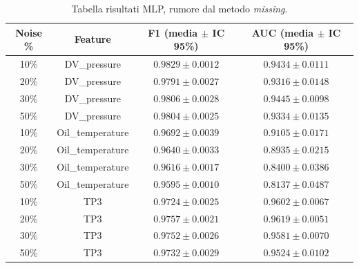 \documentclass[../main.tex]{subfiles}
\begin{document}
\begin{table}[H]
\centering\small
{}
\begin{tabular}{cccc}
\toprule
\textbf{Noise \%} & \textbf{Feature} & \textbf{F1 (media $\pm$ IC 95\%)} & \textbf{AUC (media $\pm$ IC 95\%)} \\
\midrule
10\% & DV\_pressure     & $0.9829 \pm 0.0012$ & $0.9434 \pm 0.0111$ \\
20\% & DV\_pressure     & $0.9791 \pm 0.0027$ & $0.9316 \pm 0.0148$ \\
30\% & DV\_pressure     & $0.9806 \pm 0.0028$ & $0.9445 \pm 0.0098$ \\
50\% & DV\_pressure     & $0.9804 \pm 0.0025$ & $0.9334 \pm 0.0135$ \\
\midrule
10\% & Oil\_temperature & $0.9692 \pm 0.0039$ & $0.9105 \pm 0.0171$ \\
20\% & Oil\_temperature & $0.9640 \pm 0.0033$ & $0.8935 \pm 0.0215$ \\
30\% & Oil\_temperature & $0.9616 \pm 0.0017$ & $0.8400 \pm 0.0386$ \\
50\% & Oil\_temperature & $0.9595 \pm 0.0010$ & $\mathbf{0.8137 \pm 0.0487}$ \\
\midrule
10\% & TP3             & $0.9724 \pm 0.0025$ & $0.9602 \pm 0.0067$ \\
20\% & TP3             & $0.9757 \pm 0.0021$ & $0.9619 \pm 0.0051$ \\
30\% & TP3             & $0.9752 \pm 0.0026$ & $0.9581 \pm 0.0070$ \\
50\% & TP3             & $0.9732 \pm 0.0029$ & $0.9524 \pm 0.0102$ \\
\bottomrule
\end{tabular}
\caption{Tabella risultati MLP, rumore dal metodo \textit{missing}.}
\label{tab:mlp_missing}
\end{table}
\end{document}
